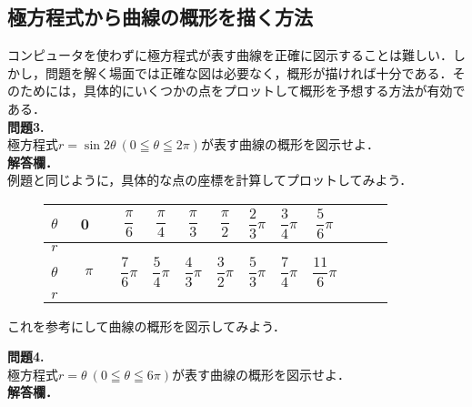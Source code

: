 \documentclass[a4paper]{ltjsarticle}
\theoremstyle{definition}
\newcommand{\1}{$\star$}
\newcommand{\2}{$\star\star$}
\newcommand{\3}{$\star\star\star$}
\newcommand{\4}{$\star\star\star\star$}
\begin{document}
  \subsection{極方程式から曲線の概形を描く方法}
 コンピュータを使わずに極方程式が表す曲線を正確に図示することは難しい．しかし，問題を解く場面では正確な図は必要なく，概形が描ければ十分である．そのためには，具体的にいくつかの点をプロットして概形を予想する方法が有効である．\\[3pt]
\newpage
\thispagestyle{empty}
\noindent \textbf{問題3.}\\[3pt]
\noindent 
極方程式$r=\sin2\theta~(0\leqq\theta\leqq2\pi)$が表す曲線の概形を図示せよ．\\[3pt]
\textbf{解答欄．}\\
例題と同じように，具体的な点の座標を計算してプロットしてみよう．
\begin{figure}[H]
    \centering
    \begin{tabular}{|c||c|c|c|c|c|c|c|c|c|c|c|}
        \hline
    $\theta$&~0~~&$ \dfrac{\pi}{6}$&$ \dfrac{\pi}{4}$ &$ \dfrac{\pi}{3}$&$ \dfrac{\pi}{2}$&$ \dfrac{2}{3}\pi$&$ \dfrac{3}{4}\pi$&$ \dfrac{5}{6}\pi$ \\\hline
    $r$ &  &&&&&& &\\ \hline
    $\theta$&$\pi$&$ \dfrac{7}{6}\pi$&$ \dfrac{5}{4}\pi$ &$ \dfrac{4}{3}\pi$&$ \dfrac{3}{2}\pi$&$ \dfrac{5}{3}\pi$&$ \dfrac{7}{4}\pi$&$ \dfrac{11}{6}\pi$ \\\hline
    $r$ &  &&&&&& & \\ \hline
    \end{tabular}
\end{figure}
\noindent これを参考にして曲線の概形を図示してみよう．
\begin{figure}[H]
    \centering
\end{figure}
 \noindent \textbf{問題4.}\\[3pt]
 \noindent 
 極方程式$r=\theta~(0\leqq\theta\leqq6\pi)$が表す曲線の概形を図示せよ．\\[3pt]
 \textbf{解答欄．}
 \begin{figure}[H]
    \centering
\end{figure}
\end{document}

